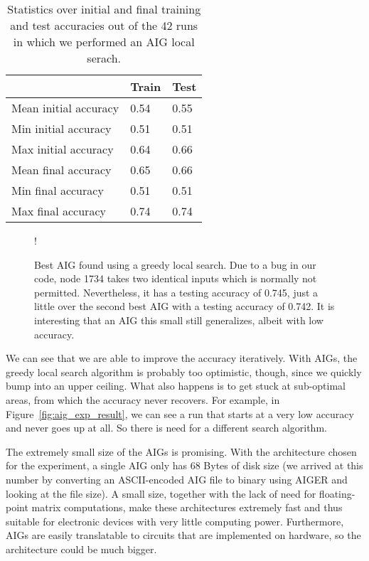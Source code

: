 \begin{table}[!htb]
  \centering
\begin{tabular}{lll}
                      & Train & Test \\ \hline
Mean initial accuracy & 0.54  & 0.55 \\
Min initial accuracy  & 0.51  & 0.51 \\
Max initial accuracy  & 0.64  & 0.66 \\
Mean final accuracy   & 0.65  & 0.66 \\
Min final accuracy    & 0.51  & 0.51 \\
Max final accuracy    & 0.74  & 0.74
\end{tabular}
\caption{Statistics over initial and final training and test accuracies out of the 42 runs in which we performed an AIG local serach.}
\label{tab:aig_accuracies}
\end{table}

\begin{figure}[!htb]
  \centering
  \resizebox {.8\textwidth} {!} {
    
  }
  \caption{Best AIG found using a greedy local search. Due to a bug in our code, node 1734 takes two identical inputs which is normally not permitted. Nevertheless, it has a testing accuracy of 0.745, just a little over the second best AIG with a testing accuracy of 0.742. It is interesting that an AIG this small still generalizes, albeit with low accuracy.}
  \label{fig:best_aig}
\end{figure}
\FloatBarrier

\noindent We can see that we are able to improve the accuracy iteratively. With AIGs, the greedy local search algorithm is probably too optimistic, though, since we quickly bump into an upper ceiling. What also happens is to get stuck at sub-optimal areas, from which the accuracy never recovers. For example, in Figure~\ref{fig:aig_exp_result}, we can see a run that starts at a very low accuracy and never goes up at all. So there is need for a different search algorithm.

The extremely small size of the AIGs is promising. With the architecture chosen for the experiment, a single AIG only has 68 Bytes of disk size (we arrived at this number by converting an ASCII-encoded AIG file to binary using AIGER and looking at the file size). A small size, together with the lack of need for floating-point matrix computations, make these architectures extremely fast and thus suitable for electronic devices with very little computing power. Furthermore, AIGs are easily translatable to circuits that are implemented on hardware, so the architecture could be much bigger.

